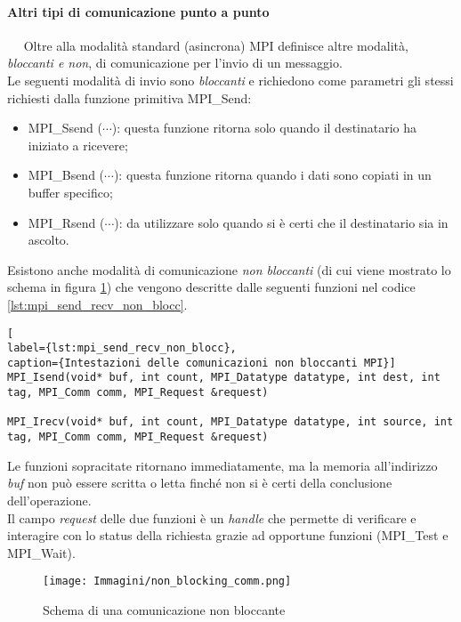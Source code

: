 \paragraph{Altri tipi di comunicazione punto a punto}~\newline~\newline
Oltre alla modalità standard (asincrona) MPI definisce altre modalità, \textit{bloccanti e non}, di comunicazione per l’invio di un messaggio.\\
Le seguenti modalità di invio sono \emph{bloccanti} e richiedono come parametri gli stessi richiesti dalla funzione primitiva MPI\_Send:
\begin{itemize}
	\item MPI\_Ssend ($\cdots$): questa funzione ritorna solo quando il destinatario ha iniziato a ricevere;
	\item MPI\_Bsend ($\cdots$): questa funzione ritorna quando i dati sono copiati in un buffer specifico;
	\item MPI\_Rsend ($\cdots$): da utilizzare solo quando si è certi che il destinatario sia in ascolto.
\end{itemize}
Esistono anche modalità di comunicazione \emph{non bloccanti} (di cui viene mostrato lo schema in figura \ref{fig:mpi_non_block_comm}) che vengono descritte dalle seguenti funzioni nel codice \ref{lst:mpi_send_recv_non_blocc}.\\
\begin{lstlisting}[ 
label={lst:mpi_send_recv_non_blocc},
caption={Intestazioni delle comunicazioni non bloccanti MPI}]
MPI_Isend(void* buf, int count, MPI_Datatype datatype, int dest, int tag, MPI_Comm comm, MPI_Request &request)

MPI_Irecv(void* buf, int count, MPI_Datatype datatype, int source, int tag, MPI_Comm comm, MPI_Request &request)
\end{lstlisting}
Le funzioni sopracitate ritornano immediatamente, ma la memoria all’indirizzo \textit{buf} non può essere scritta o letta finché non si è certi della conclusione dell’operazione.\\
Il campo \textit{request} delle due funzioni è un \textit{handle} che permette di verificare e interagire con lo status della richiesta grazie ad opportune funzioni (MPI\_Test e MPI\_Wait).
\begin{figure}[H]
	\centering
	\texttt{[image: Immagini/non\_blocking\_comm.png]}
	\caption{Schema di una comunicazione non bloccante}
	\label{fig:mpi_non_block_comm}
\end{figure}
